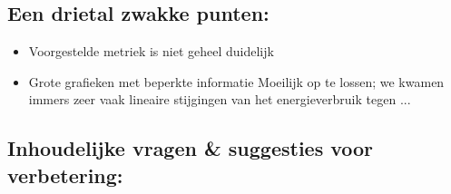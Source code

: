 \documentclass[11pt]{article}
\begin{document}
\subsection{Een drietal zwakke punten:}
\begin{itemize}
\item Voorgestelde metriek is niet geheel duidelijk
\item Grote grafieken met beperkte informatie {\color{red} Moeilijk op te lossen; we kwamen immers zeer vaak lineaire stijgingen van het energieverbruik tegen ...}
\end{itemize}

\subsection{Inhoudelijke vragen \& suggesties voor verbetering:}
\end{document}
